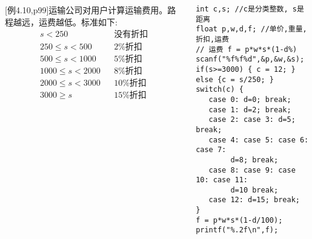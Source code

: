 \begin{frame}
\begin{columns}[T]
\small
[例4.10,p99]运输公司对用户计算运输费用。路程越远，运费越低。标准如下:  
\begin{align*}
s<250 &&\text{没有折扣}\\
250\le s < 500 &&\text{2\%折扣}\\
500\le s < 1000 &&\text{5\%折扣}\\
1000\le s < 2000 &&\text{8\%折扣}\\
2000\le s < 3000 &&\text{10\%折扣}\\
3000\ge s  &&\text{15\%折扣}
\end{align*}
\begin{lstlisting}
int c,s; //c是分类整数, s是距离
float p,w,d,f; //单价,重量,折扣,运费
// 运费 f = p*w*s*(1-d%) 
scanf("%f%f%d",&p,&w,&s);
if(s>=3000) { c = 12; } else {c = s/250; }
switch(c) {
   case 0: d=0; break;
   case 1: d=2; break;
   case 2: case 3: d=5; break;
   case 4: case 5: case 6: case 7: 
        d=8; break;
   case 8: case 9: case 10: case 11: 
        d=10 break;
   case 12: d=15; break;
}
f = p*w*s*(1-d/100);  printf("%.2f\n",f);
\end{lstlisting}
\end{columns}
\end{frame}
